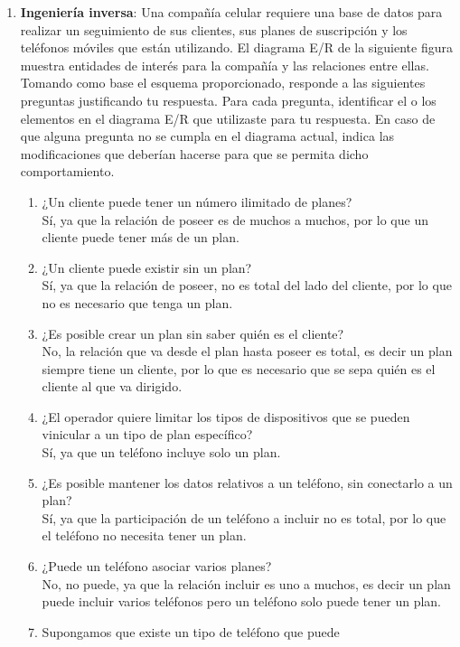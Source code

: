 \documentclass[a4paper, 12pt]{report}
\begin{document}
\begin{enumerate}
		\item \textbf{Ingeniería inversa}:
		Una compañía celular requiere una base de datos para realizar
		un seguimiento de sus clientes, sus planes de suscripción y 
		los teléfonos móviles que  están  utilizando.  El diagrama 
		E/R de  la  siguiente figura  muestra  entidades  de  interés  
		para  la  compañía  y  las  relaciones  entre  ellas.  
		Tomando  como base el esquema proporcionado, responde a las 
		siguientes preguntas justificando tu respuesta. Para cada 
		pregunta, identificar el o los elementos en el diagrama E/R 
		que utilizaste para tu respuesta. En caso de que alguna 
		pregunta no se cumpla en el diagrama actual, indica las 
		modificaciones que deberían hacerse para que se permita dicho 
		comportamiento.\\
		\begin{enumerate}
			\item ¿Un cliente puede tener un número ilimitado de planes?\\
			Sí, ya que la relación de poseer es de muchos a muchos, por
			lo que un cliente puede tener más de un plan.
			\item ¿Un cliente puede existir sin un plan?\\
			Sí, ya que la relación de poseer, no es total del lado del 
			cliente, por lo que no es necesario que tenga un plan.
			\item ¿Es posible crear un plan sin saber quién es el 
			cliente?\\
			No, la relación que va desde el plan hasta poseer es total,
			es decir un plan siempre tiene un cliente, por lo que es
			necesario que se sepa quién es el cliente al que va 
			dirigido.
			\item ¿El operador quiere limitar los tipos de dispositivos
			que se pueden vinicular a un tipo de plan específico?\\
			Sí, ya que un teléfono incluye solo un plan.
			\item ¿Es posible mantener los datos relativos a un 
			teléfono, sin conectarlo a un plan?\\
			Sí, ya que la participación de un teléfono a incluir no es
			total, por lo que el teléfono no necesita tener un plan.
			\item ¿Puede un teléfono asociar varios planes?\\
			No, no puede, ya que la relación incluir es uno a muchos, 
			es decir un plan puede incluir varios teléfonos pero un
			teléfono solo puede tener un plan.
			\item Supongamos que existe un tipo de teléfono que puede

\end{enumerate}
\end{enumerate}
\end{document}
